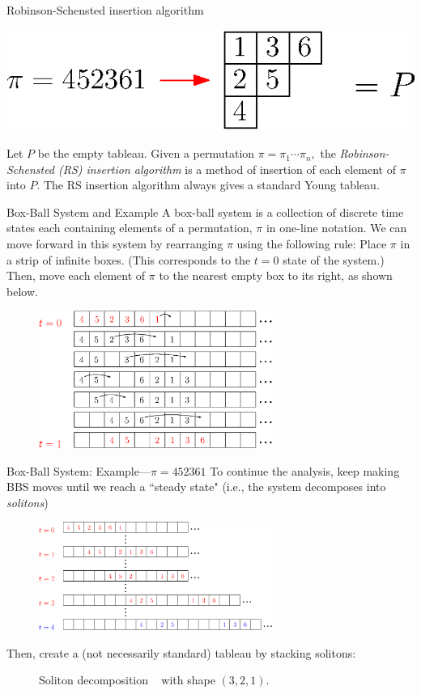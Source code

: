 \documentclass[handout, serif]{beamer}
\begin{document}
\begin{frame}{Robinson-Schensted insertion algorithm}
\begin{center}
      \includegraphics[scale = 0.85]{RS_Example.eps}
        \end{center}
    Let $P$ be the empty tableau. Given a permutation $\pi = \pi_1\cdots\pi_n,$ the \textit{Robinson-Schensted (RS) insertion algorithm} is a method of insertion of each element of $\pi$ into $P.$ The RS insertion algorithm always gives a standard Young tableau.
\end{frame}
    \begin{frame}{Box-Ball System and Example}
A box-ball system is a collection of discrete time states each containing elements of a permutation, $\pi$ in one-line notation. We can move forward in this system by rearranging $\pi$ using the following rule: Place $\pi$ in a strip of infinite boxes. (This corresponds to the $t=0$ state of the system.) Then, move each element of $\pi$ to the nearest empty box to its right, as shown below.
        \pause
        \begin{figure}
            \centering
                \includegraphics[width = 3in]{Step3.eps}
        \end{figure}
    \end{frame}
    \begin{frame}{Box-Ball System: Example---$\pi=452361$}
        To continue the analysis, keep making BBS moves until we reach a ``steady state" (i.e., the system decomposes into \textit{solitons})
        \begin{figure}
            \centering
            \includegraphics[width = 3in]{Step4V2.eps}
            \end{figure}
        Then, create a (not necessarily standard) tableau by stacking solitons:\\
        \begin{figure}
            \centering
            Soliton decomposition
            ~
             with shape $(3,2,1)$.
        \end{figure}
\end{frame}
\end{document}
